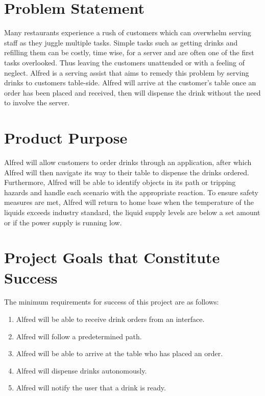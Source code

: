 \documentclass [11pt]{article}
\begin{document}
\pagebreak


\section{Problem Statement}

\indent\indent Many restaurants experience a rush of customers which can overwhelm serving staff as they juggle multiple tasks. Simple tasks such as getting drinks and refilling them can be costly, time wise, for a server and are often one of the first tasks overlooked. Thus leaving the customers unattended or with a feeling of neglect. Alfred is a serving assist that aims to remedy this problem by serving drinks to customers table-side. Alfred will arrive at the customer's table once an order has been placed and received, then will dispense the drink without the need to involve the server. 


\section{Product Purpose}

\indent\indent Alfred will allow customers to order drinks through an application, after which Alfred will then navigate its way to their table to dispense the drinks ordered. Furthermore, Alfred will be able to identify objects in its path or tripping hazards and handle each scenario with the appropriate reaction. To ensure safety measures are met, Alfred will return to home base when the temperature of the liquids exceeds industry standard, the liquid supply levels are below a set amount or if the power supply is running low.


\section{Project Goals that Constitute Success }
The minimum requirements for success of this project are as follows:

\begin{enumerate}[label=M\arabic*:, ref =\arabic*, leftmargin=0.5in]

	\item Alfred will be able to receive drink orders from an interface.
	\item Alfred will follow a predetermined path.
	\item Alfred will be able to arrive at the table who has placed an order.
	\item Alfred will dispense drinks autonomously.
	\item Alfred will notify the user that a drink is ready.
	
\end{enumerate}
\end{document}
